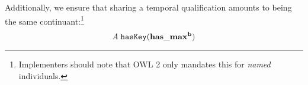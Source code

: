 Additionally, we ensure that sharing a temporal qualification amounts to being
the same continuant:\footnote{Implementers should note that OWL 2 only mandates
this for \emph{named} individuals.}
\begin{equation}
\mathit{A}\;\mathtt{hasKey}(\mathrm{\mathbf{has\_max^b}})
\end{equation}





%

%




